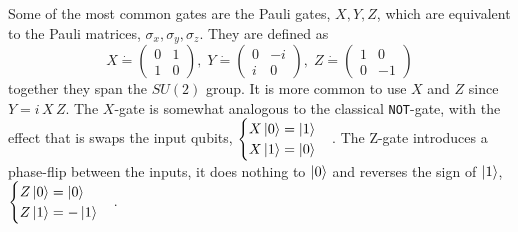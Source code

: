 Some of the most common gates are the Pauli gates, $X,Y,Z$, which are equivalent to the Pauli matrices, $\sigma_x,\sigma_y,\sigma_z$. 
They are defined as
\begin{equation}
X \dot{=}\begin{pmatrix}
0 & 1 \\ 1 & 0
\end{pmatrix},\; 
Y\dot{=}\begin{pmatrix}
0 & -i \\ i & 0
\end{pmatrix},\; 
Z \dot{=} \begin{pmatrix}
1 & 0 \\ 0 & -1
\end{pmatrix}
\end{equation}
together they span the $SU(2)$ group.  
It is more common to use $X$ and $Z$ since $Y = i\,X\,Z$. The $X$-gate is somewhat analogous to the classical {\tt NOT}-gate,  
with the effect that is swaps the input qubits, 
$\begin{cases} X\ket{0} = \ket{1}\\
X\ket{1} = \ket{0}
\end{cases}$.
The Z-gate introduces a phase-flip between the inputs, it does nothing to $\ket{0}$ and reverses the sign of $\ket{1}$, $\begin{cases} Z\ket{0} = \ket{0}\\
Z\ket{1} = -\ket{1}
\end{cases}$.
 
